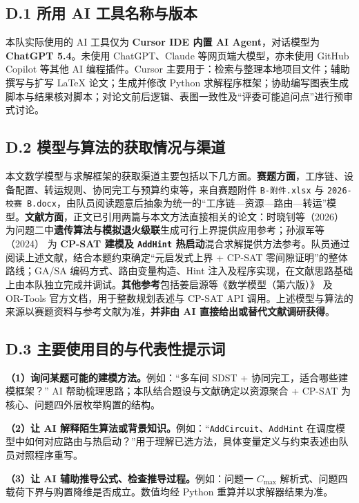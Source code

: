 \documentclass[12pt,a4paper]{ctexart}
\begin{document}
\subsection*{D.1 所用 AI 工具名称与版本}

本队实际使用的 AI 工具仅为 \textbf{Cursor IDE 内置 AI Agent}，对话模型为 \textbf{ChatGPT 5.4}。未使用 ChatGPT、Claude 等网页端大模型，亦未使用 GitHub Copilot 等其他 AI 编程插件。Cursor 主要用于：检索与整理本地项目文件；辅助撰写与扩写 \LaTeX{} 论文；生成并修改 Python 求解程序框架；协助编写图表生成脚本与结果核对脚本；对论文前后逻辑、表图一致性及“评委可能追问点”进行预审式讨论。

\subsection*{D.2 模型与算法的获取情况与渠道}

本文数学模型与求解框架的获取渠道主要包括以下几方面。\textbf{赛题方面}，工序链、设备配置、转运规则、协同完工与预算约束等，来自赛题附件 \texttt{B-附件.xlsx} 与 \texttt{2026-校赛 B.docx}，由队员阅读题意后抽象为统一的“工序链—资源—路由—转运”模型。\textbf{文献方面}，正文已引用两篇与本文方法直接相关的论文：时晓钊等（2026）\cite{shi2026} 为问题二中\textbf{遗传算法与模拟退火级联}生成可行上界提供应用参考；孙淑军等（2024）\cite{sun2024} 为 \textbf{CP-SAT 建模及 \texttt{AddHint} 热启动}混合求解提供方法参考。队员通过阅读上述文献，结合本题约束确定“元启发式上界 + CP-SAT 零间隙证明”的整体路线；GA/SA 编码方式、路由变量构造、Hint 注入及程序实现，在文献思路基础上由本队独立完成并调试。\textbf{其他参考}包括姜启源等《数学模型（第六版）》\cite{jiang2024} 及 OR-Tools 官方文档，用于整数规划表述与 CP-SAT API 调用。上述模型与算法的来源以赛题资料与参考文献为准，\textbf{并非由 AI 直接给出或替代文献调研获得}。

\subsection*{D.3 主要使用目的与代表性提示词}

\textbf{（1）询问某题可能的建模方法。}例如：“多车间 SDST + 协同完工，适合哪些建模框架？” AI 帮助梳理思路；本队结合题设与文献确定以资源聚合 + CP-SAT 为核心、问题四外层枚举购置的结构。

\textbf{（2）让 AI 解释陌生算法或背景知识。}例如：“\texttt{AddCircuit}、\texttt{AddHint} 在调度模型中如何对应路由与热启动？”用于理解已选方法，具体变量定义与约束表述由队员对照程序重写。

\textbf{（3）让 AI 辅助推导公式、检查推导过程。}例如：问题一 $C_{\max}$ 解析式、问题四载荷下界与购置降维是否成立。数值均经 Python 重算并以求解器结果为准。
\end{document}
